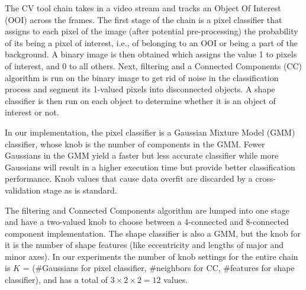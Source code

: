 The CV tool chain takes in a video stream and tracks an Object Of Interest (OOI) across the frames. 
The first stage of the chain is a pixel classifier that assigns to each pixel of the image (after potential pre-processing) the probability of its being a pixel of interest, i.e., of belonging to an OOI or being a part of the background. 
A binary image is then obtained which assigns the value 1 to pixels of interest, and 0 to all others. 
Next, filtering and a Connected Components (CC) algorithm is run on the binary image to get rid of noise in the classification process and segment its 1-valued pixels into disconnected objects. 
A shape classifier is then run on each object to determine whether it is an object of interest or not.

In our implementation, the pixel classifier is a Gaussian Mixture Model (GMM) classifier, whose knob is the number of components in the GMM. 
Fewer Gaussians in the GMM yield a faster but less accurate classifier while more Gaussians will result in a higher execution time but provide better classification performance. 
Knob values that cause data overfit are discarded by a cross-validation stage as is standard.

The filtering and Connected Components algorithm are lumped into one stage and have a two-valued knob to choose between a 4-connected and 8-connected component implementation. 
The shape classifier is also a GMM, but the knob for it is the number of shape features (like eccentricity and lengths of major and minor axes).
In our experiments the number of knob settings for the entire chain is $K$ = (\#Gaussians for pixel classifier, \#neighbors for CC, \#features for shape classifier), and has a total of $3 \times 2 \times 2 = 12$ values.

